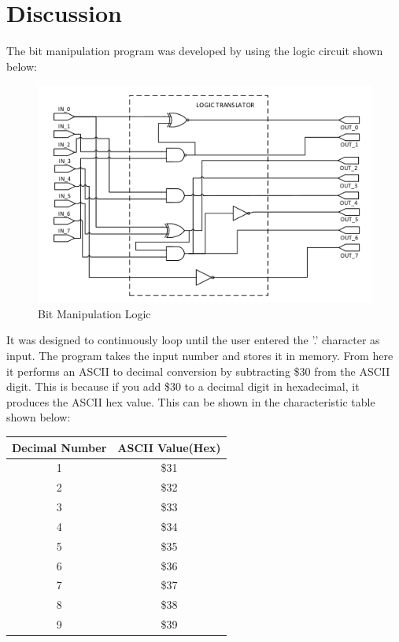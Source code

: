 \documentclass[12pt, twocolumn]{article}
\begin{document}
\section{Discussion}

The bit manipulation program was developed by using the logic circuit shown below:
\begin{figure}[H]
\centering
\includegraphics[width=1\linewidth]{algorithm}
\caption{Bit Manipulation Logic}
\label{fig:algorithm}
\end{figure}

It was designed to continuously loop until the user entered the '.' character as input. The program takes the input number and stores it in memory. From here it performs an ASCII to decimal conversion by subtracting \$30 from the ASCII digit. This is because if you add \$30 to a decimal digit in hexadecimal, it produces the ASCII hex value. This can be shown in the characteristic table shown below:
\vspace{0.5cm}

\begin{center}
\begin{tabular}{|c|c|}
	\hline
	Decimal Number & ASCII Value(Hex)\\
	\hline
	1 & \$31 \\
	\hline
	2 & \$32 \\
	\hline
	3 & \$33 \\
	\hline
	4 & \$34 \\
	\hline
	5 & \$35 \\
	\hline
	6 & \$36 \\
	\hline
	7 & \$37 \\
	\hline
	8 & \$38 \\
	\hline
	9 & \$39 \\
	\hline
\end{tabular}
\end{center}
\end{document}
